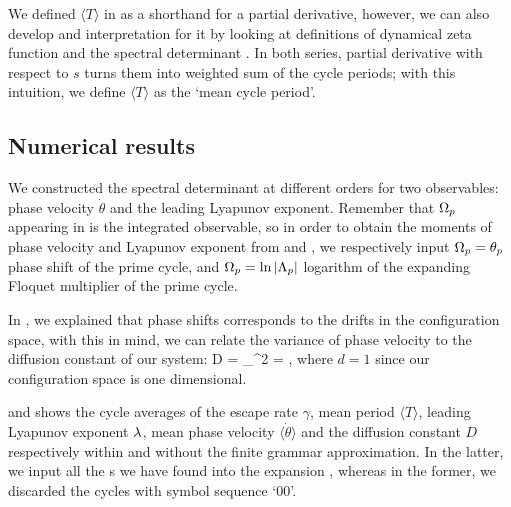 {{{We defined $\langle T \rangle$ in  as a shorthand for a partial
derivative, however, we can also develop and interpretation for it by looking at
definitions of dynamical zeta function  and the spectral
determinant . In both series, partial derivative with
respect to $s$ turns them into weighted sum of the cycle periods; with this intuition,
we define $\langle T \rangle$ as the `mean cycle period'.

\subsection{Numerical results}
\label{s-NumResults}

We constructed the spectral determinant  at different
orders for two observables: phase velocity $\dot{\theta}$ and the leading Lyapunov
exponent. Remember that $\Omega_p$ appearing in  is the
integrated observable, so in order to obtain the moments of phase velocity and
Lyapunov exponent from  and , we respectively input
$\Omega_p = \theta_p$ phase shift of the prime cycle, and $\Omega_p = \ln |\Lambda_p|$ logarithm
of the expanding Floquet multiplier of the prime cycle.

In , we explained that  phase shifts corresponds to
the drifts in the configuration space, with this in mind, we can relate the
variance of phase velocity to the diffusion constant of our system:
\beq
    D =  \sigma_{\dot{\theta}}^2
      =  ,
\eeq
where $d=1$ since our configuration space is one dimensional.

 and  shows
the cycle averages of the escape rate $\gamma$, mean period $\langle T \rangle$,
leading Lyapunov exponent $\lambda$, mean phase velocity $\langle \dot{\theta} \rangle$
and the diffusion constant $D$ respectively within and without the finite grammar
approximation. In the latter, we input all the \rpo s we have found into the expansion
, whereas in the former, we discarded the cycles
with symbol sequence `00'.




}}}
